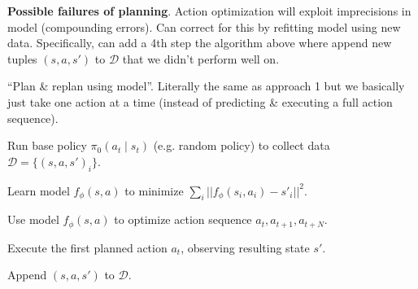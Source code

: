 \documentclass[11pt]{article}
\begin{document}
\textbf{Possible failures of planning}. Action optimization will exploit imprecisions in model (compounding errors). Can correct for this by refitting model using new data. Specifically, can add a 4th step the algorithm above where append new tuples $(s, a, s')$ to $\mathcal D$ that we didn't perform well on. 

\begin{compactitem}
	
	
\end{compactitem}

\begin{algorithm}
	``Plan \& replan using model''. Literally the same as approach 1 but we basically just take one action at a time (instead of predicting \& executing a full action sequence). 
	\begin{compactenum}
		\item Run base policy $\pi_0(a_t \mid s_t)$ (e.g. random policy) to collect data $\mathcal D = \{ (s, a, s')_i \}$. 
	
		\item Learn model $f_{\phi}(s, a)$ to minimize $\sum_i || f_{\phi}(s_i, a_i) - s'_i ||^2$. 
	
		\item Use model $f_{\phi}(s, a)$ to optimize action sequence $a_t, a_{t+1}, a_{t+N}$. 
		\begin{compactenum}
				\item Execute the first planned action $a_t$, observing resulting state $s'$. 
				\item Append $(s, a, s')$ to $\mathcal D$. 
		\end{compactenum}
	\end{compactenum}
 
\end{algorithm}
\end{document}
